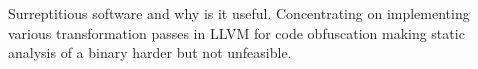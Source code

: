Surreptitious software and why is it useful. Concentrating on
implementing various transformation passes in LLVM for code obfuscation making
static analysis of a binary harder but not unfeasible.